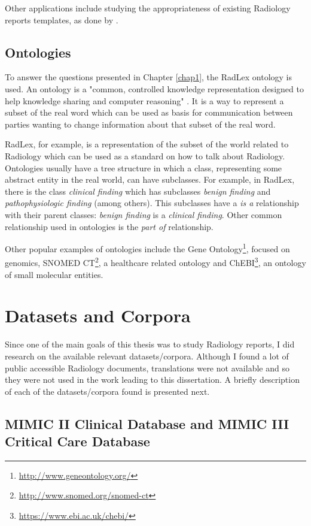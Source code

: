 Other applications include studying the appropriateness of existing Radiology reports templates, as done by \citep{Hong2013}.

\subsection{Ontologies}

To answer the questions presented in Chapter \ref{chap1}, the RadLex ontology is used. An ontology is a "common, controlled knowledge representation designed to help knowledge sharing and computer reasoning" \citep{Robinson2011}. It is a way to represent a subset of the real word  which can be used as basis for communication between parties wanting to change information about that subset of the real word.

RadLex, for example, is a representation of the subset of the world related to Radiology which can be used as a standard on how to talk about Radiology. Ontologies usually have a tree structure in which a class, representing some abstract entity in the real world, can have subclasses. For example, in RadLex, there is the class \textit{clinical finding} which has subclasses \textit{benign finding} and \textit{pathophysiologic finding} (among others). This subclasses have a \textit{is a} relationship with their parent classes: \textit{benign finding} is a \textit{clinical finding}. Other common relationship used in ontologies is the \textit{part of} relationship.

Other popular examples of ontologies include the Gene Ontology\footnote{\url{http://www.geneontology.org/}}, focused on genomics, SNOMED CT\footnote{\url{http://www.snomed.org/snomed-ct}}, a healthcare related ontology and ChEBI\footnote{\url{https://www.ebi.ac.uk/chebi/}}, an ontology of small molecular entities.

\section{Datasets and Corpora}

Since one of the main goals of this thesis was to study Radiology reports, I did research on the available relevant datasets/corpora. Although I found a lot of public accessible Radiology documents, translations were not available and so they were not used in the work leading to this dissertation. A briefly description of each of the datasets/corpora found is presented next. 

\subsection{MIMIC II Clinical Database and MIMIC III Critical Care Database}

